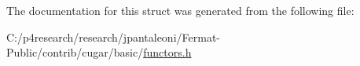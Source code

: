 The documentation for this struct was generated from the following file\+:\begin{DoxyCompactItemize}
\item 
C\+:/p4research/research/jpantaleoni/\+Fermat-\/\+Public/contrib/cugar/basic/\hyperlink{functors_8h}{functors.\+h}\end{DoxyCompactItemize}
